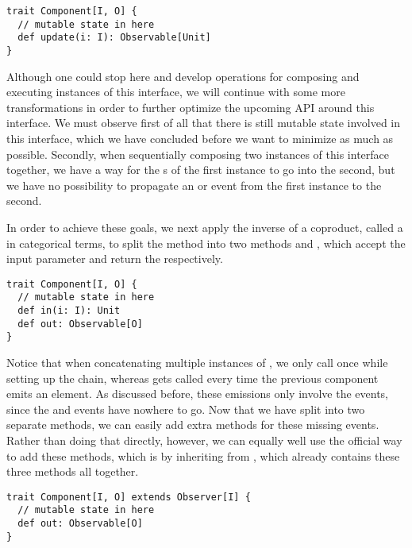 \begin{lstlisting}[style=InlineScalaStyle]
trait Component[I, O] {
  // mutable state in here
  def update(i: I): Observable[Unit]
}
\end{lstlisting}

Although one could stop here and develop operations for composing and executing instances of this interface, we will continue with some more transformations in order to further optimize the upcoming API around this interface. We must observe first of all that there is still mutable state involved in this interface, which we have concluded before we want to minimize as much as possible. Secondly, when sequentially composing two instances of this interface together, we have a way for the s of the first instance to go into the second, but we have no possibility to propagate an  or  event from the first instance to the second.

In order to achieve these goals, we next apply the inverse of a coproduct, called a  in categorical terms, to split the  method into two methods  and , which accept the input parameter  and return the  respectively.

\begin{lstlisting}[style=InlineScalaStyle]
trait Component[I, O] {
  // mutable state in here
  def in(i: I): Unit
  def out: Observable[O]
}
\end{lstlisting}

Notice that when concatenating multiple instances of \comp, we only call  once while setting up the chain, whereas  gets called every time the previous component emits an element. As discussed before, these emissions only involve the  events, since the  and  events have nowhere to go. Now that we have split  into two separate methods, we can easily add extra methods for these missing events. Rather than doing that directly, however, we can equally well use the official way to add these methods, which is by inheriting \comp from \obv, which already contains these three methods all together.

\begin{lstlisting}[style=InlineScalaStyle]
trait Component[I, O] extends Observer[I] {
  // mutable state in here
  def out: Observable[O]
}
\end{lstlisting}

